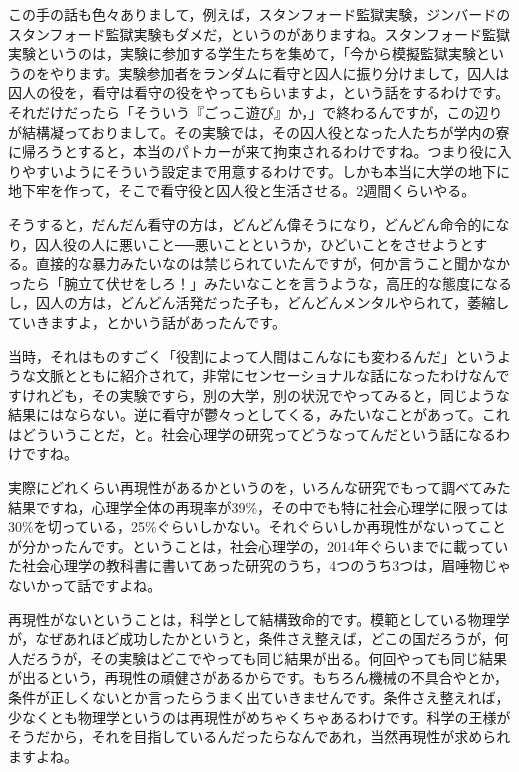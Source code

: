 \documentclass{ltjsbook}
\begin{document}
この手の話も色々ありまして，例えば，スタンフォード監獄実験，ジンバードのスタンフォード監獄実験もダメだ，というのがありますね。スタンフォード監獄実験というのは，実験に参加する学生たちを集めて，「今から模擬監獄実験というのをやります。実験参加者をランダムに看守と囚人に振り分けまして，囚人は囚人の役を，看守は看守の役をやってもらいますよ，という話をするわけです。それだけだったら「そういう『ごっこ遊び』か，」で終わるんですが，この辺りが結構凝っておりまして。その実験では，その囚人役となった人たちが学内の寮に帰ろうとすると，本当のパトカーが来て拘束されるわけですね。つまり役に入りやすいようにそういう設定まで用意するわけです。しかも本当に大学の地下に地下牢を作って，そこで看守役と囚人役と生活させる。2週間くらいやる。

そうすると，だんだん看守の方は，どんどん偉そうになり，どんどん命令的になり，囚人役の人に悪いこと──悪いことというか，ひどいことをさせようとする。直接的な暴力みたいなのは禁じられていたんですが，何か言うこと聞かなかったら「腕立て伏せをしろ！」みたいなことを言うような，高圧的な態度になるし，囚人の方は，どんどん活発だった子も，どんどんメンタルやられて，萎縮していきますよ，とかいう話があったんです。

当時，それはものすごく「役割によって人間はこんなにも変わるんだ」というような文脈とともに紹介されて，非常にセンセーショナルな話になったわけなんですけれども，その実験ですら，別の大学，別の状況でやってみると，同じような結果にはならない。逆に看守が鬱々っとしてくる，みたいなことがあって\parencite{Reicher2006}。これはどういうことだ，と。社会心理学の研究ってどうなってんだという話になるわけですね。

実際にどれくらい再現性があるかというのを，いろんな研究でもって調べてみた結果ですね，心理学全体の再現率が39\%，その中でも特に社会心理学に限っては30\%を切っている，25\%ぐらいしかない。それぐらいしか再現性がないってことが分かったんです。ということは，社会心理学の，2014年ぐらいまでに載っていた社会心理学の教科書に書いてあった研究のうち，4つのうち3つは，眉唾物じゃないかって話ですよね。

再現性がないということは，科学として結構致命的です。模範としている物理学が，なぜあれほど成功したかというと，条件さえ整えば，どこの国だろうが，何人だろうが，その実験はどこでやっても同じ結果が出る。何回やっても同じ結果が出るという，再現性の頑健さがあるからです。もちろん機械の不具合やとか，条件が正しくないとか言ったらうまく出ていきませんです。条件さえ整えれば，少なくとも物理学というのは再現性がめちゃくちゃあるわけです。科学の王様がそうだから，それを目指しているんだったらなんであれ，当然再現性が求められますよね。
\end{document}
